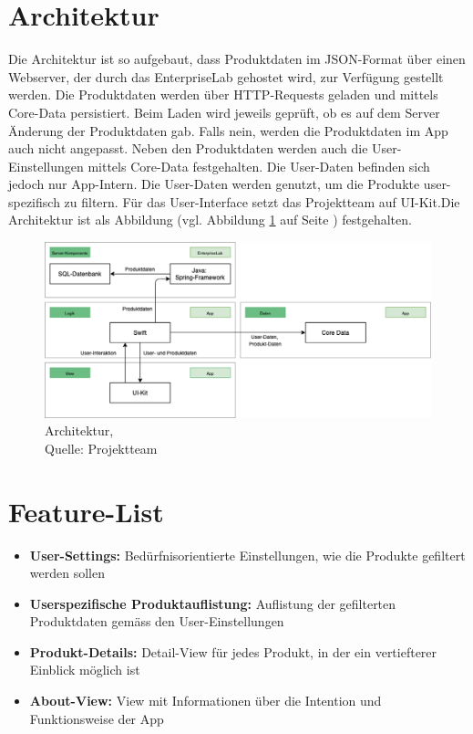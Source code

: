 \documentclass[12pt,titlepage]{article}
\begin{document}
\section{Architektur}
Die Architektur ist so aufgebaut, dass Produktdaten im JSON-Format über einen Webserver, der durch das EnterpriseLab gehostet wird, zur Verfügung gestellt werden. Die Produktdaten werden über HTTP-Requests geladen und mittels Core-Data persistiert. Beim Laden wird jeweils geprüft, ob es auf dem Server Änderung der Produktdaten gab. Falls nein, werden die Produktdaten im App auch nicht angepasst. Neben den Produktdaten werden auch die User-Einstellungen mittels Core-Data festgehalten. Die User-Daten befinden sich jedoch nur App-Intern. Die User-Daten werden genutzt, um die Produkte user-spezifisch zu filtern. Für das User-Interface setzt das Projektteam auf UI-Kit.Die Architektur ist als Abbildung (vgl. Abbildung \ref{img: Architektur} auf Seite \pageref{img: Architektur}) festgehalten.\\
\begin{figure}[H]
	\centering
	\includegraphics[width=16cm]{Img/Architektur.png}
	\caption[Architektur]{Architektur,\\ Quelle: Projektteam}
	\label{img: Architektur}
\end{figure}

\section{Feature-List}
\begin{itemize}
\item \textbf{User-Settings:} Bedürfnisorientierte Einstellungen, wie die Produkte gefiltert werden sollen
\item \textbf{Userspezifische Produktauflistung:} Auflistung der gefilterten Produktdaten gemäss den User-Einstellungen
\item \textbf{Produkt-Details:} Detail-View für jedes Produkt, in der ein vertiefterer Einblick möglich ist
\item \textbf{About-View:} View mit Informationen über die Intention und Funktionsweise der App
\end{itemize}
\end{document}
